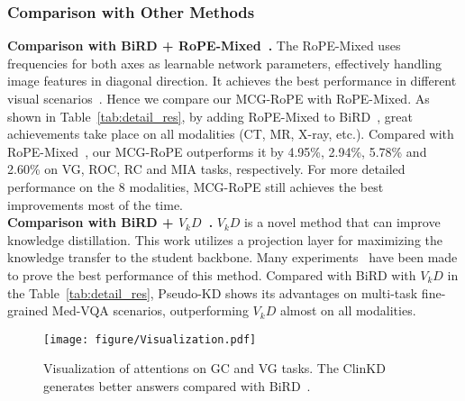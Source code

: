 \subsubsection{Comparison with Other Methods}
\textbf{Comparison with BiRD + RoPE-Mixed~\cite{heo2024rotarypositionembeddingvision}.}
The RoPE-Mixed uses frequencies for both axes as learnable network parameters, effectively handling image features in diagonal direction. It achieves the best performance in different visual scenarios~\cite{ade20k, zhou2018semanticunderstandingscenesade20k, coco}. Hence we compare our MCG-RoPE with RoPE-Mixed. As shown in Table~\ref{tab:detail_res}, by adding RoPE-Mixed to BiRD~\cite{huang2024BiRD}, great achievements take place on all modalities (CT, MR, X-ray, etc.). Compared with RoPE-Mixed~\cite{heo2024rotarypositionembeddingvision}, our MCG-RoPE outperforms it by 4.95\%, 2.94\%, 5.78\% and 2.60\% on VG, ROC, RC and MIA tasks, respectively. For more detailed performance on the 8 modalities, MCG-RoPE still achieves the best improvements most of the time.\\
\textbf{Comparison with BiRD + $V_{k}D$~\cite{Miles_2024_CVPR}.}
$V_{k}D$ is a novel method that can improve knowledge distillation. This work utilizes a projection layer for maximizing the knowledge transfer to the student backbone. Many experiments~\cite{DLGAN_CVPR, spkd, pkd, label-kd} have been made to prove the best performance of this method. Compared with BiRD with $V_kD$ in the Table~\ref{tab:detail_res}, Pseudo-KD shows its advantages on multi-task fine-grained Med-VQA scenarios, outperforming $V_kD$ almost on all modalities. 
\begin{figure}[t]
    \centering
    \begin{center}
    \texttt{[image: figure/Visualization.pdf]}
    \end{center}
    \vspace{-1em}
    \caption{Visualization of attentions on GC and VG tasks. The ClinKD generates better answers compared with BiRD~\cite{huang2024BiRD}.}
    \label{fig:visual1}
    \vspace{-1em}
\end{figure}

